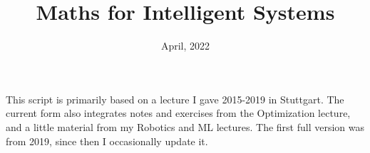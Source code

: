 

\renewcommand{\course}{Maths for Intelligent Systems}

\script

\renewcommand{\<}{\langle}
\renewcommand{\>}{\rangle}
\DeclareMathOperator{\vol}{vol}
\newcommand{\ul}{\underline}
\newcommand{\bd}{\boldsymbol}
\newcommand{\ve}[2]{\left[\arr{c}{#1\\#2}\right]}
\newcommand{\ma}[4]{\left[\arr{cc}{#1&#2\\#3&#4}\right]}
\renewcommand{\de}[4]{\left|\arr{cc}{#1&#2\\#3&#4}\right|}
\newcommand{\eig}{\text{eig}}
\renewcommand{\skew}{\text{skew}}


\newlength\rightmargintoc
\setlength\rightmargintoc{\linewidth}
\addtolength\rightmargintoc{-7em}

\makeatletter
\def\subsubsectocline#1#2#3#4#5{%
\parshape 2 4em \rightmargintoc \dimexpr\parindent+4em\relax \rightmargintoc
\@tempdima#3
\ifdim\lastskip=1sp;\relax\ \else\fi{\footnotesize#4}\hskip1sp%
}
\renewcommand*\l@subsubsection{\subsubsectocline{1}{0em}{2.5em}}
\makeatother



  \DefineShortVerb{\@}


\title{Maths for Intelligent Systems}
\date{April, 2022}



\maketitle


This script is primarily based on a lecture I gave 2015-2019 in Stuttgart.
The current form also integrates notes and exercises from the Optimization lecture, and a little material from my Robotics and ML lectures. The first full version was from 2019, since then I occasionally update it.


